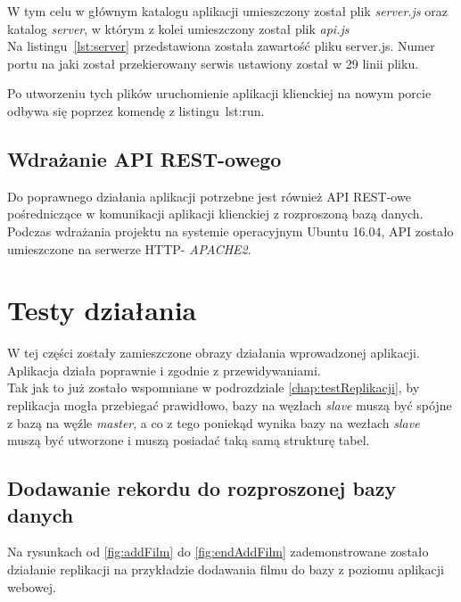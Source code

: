 W tym celu w głównym katalogu aplikacji umieszczony został plik \textit{server.js} oraz katalog \textit{server}, w którym z kolei umieszczony został plik \textit{api.js}\\

Na listingu~\ref{lst:server} przedstawiona została zawartość pliku server.js. Numer portu na jaki został przekierowany serwis ustawiony został w 29 linii pliku.

\lssetdef


\lssetdef


Po utworzeniu tych plików uruchomienie aplikacji klienckiej na nowym porcie odbywa się poprzez komendę z listingu~{lst:run}.

\lssetdef


\subsection{Wdrażanie API REST-owego}
Do poprawnego działania aplikacji potrzebne jest również API REST-owe pośredniczące w komunikacji aplikacji klienckiej z rozproszoną bazą danych. Podczas wdrażania projektu na systemie operacyjnym Ubuntu 16.04, API zostało umieszczone na serwerze HTTP- \textit{APACHE2}.

\section{Testy działania}

W tej części zostały zamieszczone obrazy działania wprowadzonej aplikacji. Aplikacja działa poprawnie i zgodnie z przewidywaniami. \\

Tak jak to już zostało wspomniane w podrozdziale \ref{chap:testReplikacji}, by replikacja mogła przebiegać prawidłowo, bazy na węzłach \textit{slave} muszą być spójne z bazą na węźle \textit{master}, a co z tego poniekąd wynika bazy na wezłach \textit{slave} muszą być utworzone i muszą posiadać taką samą strukturę tabel.

\subsection{Dodawanie rekordu do rozproszonej bazy danych}
Na rysunkach od \ref{fig:addFilm} do \ref{fig:endAddFilm} zademonstrowane zostało działanie replikacji na przykładzie dodawania filmu do bazy z poziomu aplikacji webowej.\\

